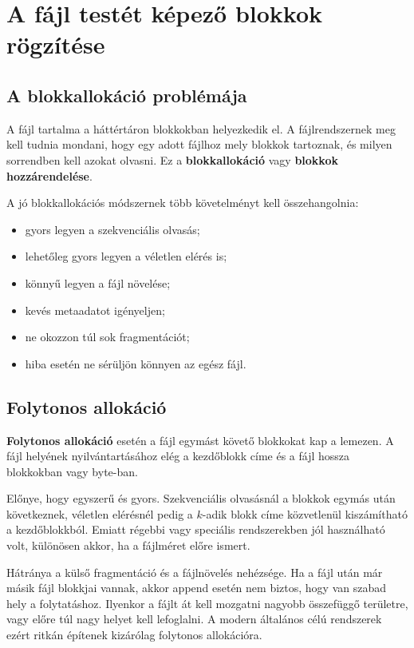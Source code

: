 \section{A fájl testét képező blokkok rögzítése}

\subsection{A blokkallokáció problémája}

A fájl tartalma a háttértáron blokkokban helyezkedik el. A fájlrendszernek meg kell tudnia mondani, hogy egy adott fájlhoz mely blokkok tartoznak, és milyen sorrendben kell azokat olvasni. Ez a \textbf{blokkallokáció} vagy \textbf{blokkok hozzárendelése}.

A jó blokkallokációs módszernek több követelményt kell összehangolnia:

\begin{itemize}
  \item gyors legyen a szekvenciális olvasás;
  \item lehetőleg gyors legyen a véletlen elérés is;
  \item könnyű legyen a fájl növelése;
  \item kevés metaadatot igényeljen;
  \item ne okozzon túl sok fragmentációt;
  \item hiba esetén ne sérüljön könnyen az egész fájl.
\end{itemize}



\subsection{Folytonos allokáció}

\textbf{Folytonos allokáció} esetén a fájl egymást követő blokkokat kap a lemezen. A fájl helyének nyilvántartásához elég a kezdőblokk címe és a fájl hossza blokkokban vagy byte-ban.

Előnye, hogy egyszerű és gyors. Szekvenciális olvasásnál a blokkok egymás után következnek, véletlen elérésnél pedig a \(k\)-adik blokk címe közvetlenül kiszámítható a kezdőblokkból. Emiatt régebbi vagy speciális rendszerekben jól használható volt, különösen akkor, ha a fájlméret előre ismert.

Hátránya a külső fragmentáció és a fájlnövelés nehézsége. Ha a fájl után már másik fájl blokkjai vannak, akkor append esetén nem biztos, hogy van szabad hely a folytatáshoz. Ilyenkor a fájlt át kell mozgatni nagyobb összefüggő területre, vagy előre túl nagy helyet kell lefoglalni. A modern általános célú rendszerek ezért ritkán építenek kizárólag folytonos allokációra.

